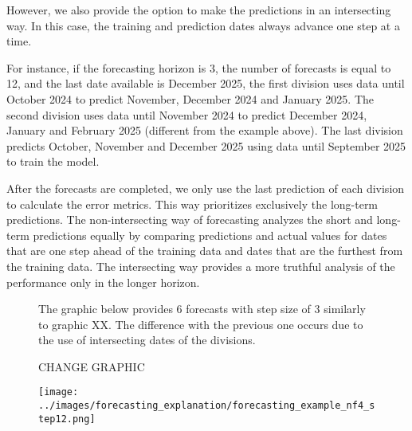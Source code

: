 However, we also provide the option to make the predictions in an intersecting way. In this case, the training and prediction dates always advance one step at a time.

For instance, if the forecasting horizon is 3, the number of forecasts is equal to 12, and the last date available is December 2025, the first division uses data until October 2024 to predict November, December 2024 and January 2025. The second division uses data until November 2024 to predict December 2024, January and February 2025 (different from the example above). The last division predicts October, November and December 2025 using data until September 2025 to train the model.

After the forecasts are completed, we only use the last prediction of each division to calculate the error metrics. This way prioritizes exclusively the long-term predictions. The non-intersecting way of forecasting analyzes the short and long-term predictions equally by comparing predictions and actual values for dates that are one step ahead of the training data and dates that are the furthest from the training data. The intersecting way provides a more truthful analysis of the performance only in the longer horizon.

\begin{figure}[H]
    The graphic below provides 6 forecasts with step size of 3 similarly to graphic XX. The difference with the previous one occurs due to the use of intersecting dates of the divisions.

    CHANGE GRAPHIC
    \begin{center}
        \texttt{[image: ../images/forecasting\_explanation/forecasting\_example\_nf4\_step12.png]}
    \end{center}
\end{figure}

